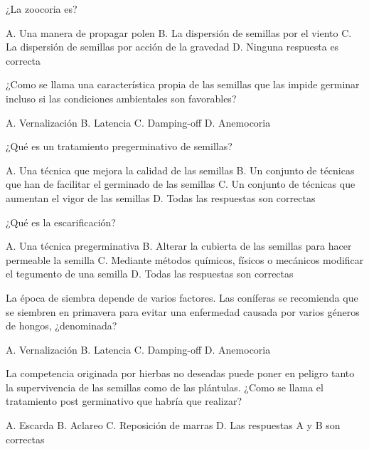 \documentclass[11pt]{exam}
\begin{document}
{\begin{questions}
\begin{checkboxes}
  \end{checkboxes}
\question ¿La zoocoria es?
  \begin{checkboxes}
    \choice A. Una manera de propagar polen
    \choice B. La dispersión de semillas por el viento
    \choice C. La dispersión de semillas por acción de la gravedad
    \CorrectChoice D. Ninguna respuesta es correcta 
  \end{checkboxes}
\question ¿Como se llama una característica propia de las semillas que las impide germinar
  incluso si las condiciones ambientales son favorables?
  \begin{checkboxes}
    \choice A. Vernalización
    \CorrectChoice B. Latencia
    \choice C. Damping-off
    \choice D. Anemocoria
  \end{checkboxes}
\question ¿Qué es un tratamiento pregerminativo de semillas?
  \begin{checkboxes}
    \choice A. Una técnica que mejora la calidad de las semillas
    \CorrectChoice B. Un conjunto de técnicas que han de facilitar el germinado de las
    semillas
    \choice C. Un conjunto de técnicas que aumentan el vigor de las semillas
    \choice D. Todas las respuestas son correctas
  \end{checkboxes}
\question ¿Qué es la escarificación?
  \begin{checkboxes}
    \choice A. Una técnica pregerminativa
    \choice B. Alterar la cubierta de las semillas para hacer permeable la semilla
    \choice C. Mediante métodos químicos, físicos o mecánicos modificar el tegumento de
    una semilla
    \CorrectChoice D. Todas las respuestas son correctas 
  \end{checkboxes}
\question La época de siembra depende de varios factores. Las coníferas se recomienda que
  se siembren en primavera para evitar una enfermedad causada por varios géneros de hongos, ¿denominada?
  \begin{checkboxes}
    \choice A. Vernalización
    \choice B. Latencia
    \CorrectChoice C. Damping-off
    \choice D. Anemocoria    
  \end{checkboxes}
  \newpage
\question La competencia originada por hierbas no deseadas puede poner en peligro tanto la
  supervivencia de las semillas como de las plántulas. ¿Como se llama el tratamiento post
  germinativo que habría que realizar?
  \begin{checkboxes}
    \CorrectChoice A. Escarda
    \choice B. Aclareo
    \choice C. Reposición de marras
    \choice D. Las respuestas A y B son correctas

\end{checkboxes}
\end{questions}}
\end{document}
